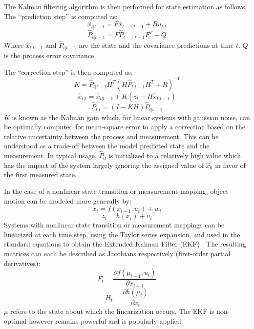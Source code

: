 \documentclass[a4paper,twoside,12pt]{report}
\begin{document}
The Kalman filtering algorithm is then performed for state estimation as follows. The ``prediction step'' is computed as:
\begin{equation}
\hat{x}_{t|t-1}=F\hat{x}_{t-1|t-1}+Bu_{t|t}
\end{equation}
\begin{equation}
\hat{P}_{t|t-1}=F\hat{P}_{t-1|t-1}F^T+Q 
\end{equation}
Where $\hat{x}_{t|t-1}$ and $\hat{P}_{t|t-1}$ are the state and the covariance predictions at  time $t$. $Q$ is the process error covariance.

The ``correction step'' is then computed as:
\begin{equation} 
K = \hat{P}_{t|t-1}H^T(H\hat{P}_{t|t-1}H^T+R)^{-1}
\end{equation}
\begin{equation} 
\hat{x}_{t|t} = \hat{x}_{t|t-1}+K(z_t-H\hat{x}_{t|t-1})
\end{equation}
\begin{equation} 
\hat{P}_{t|t}=(I-KH)\hat{P}_{t|t-1}
\end{equation}
$K$ is known as the Kalman gain which, for linear systems with gaussian noise, can be optimally computed for mean-square error to apply a correction based on the relative uncertainty between the process and measurement. This can be understood as a trade-off between the model predicted state and the measurement. In typical usage, $\hat{P}_0$ is initialized to a relatively high value which has the impact of the system largely ignoring the assigned value of $\hat{x}_{0}$ in favor of the first measured state.

In the case of a nonlinear state transition or measurement mapping, object motion can be modeled more generally by:
\begin{equation} 
x_t=f(x_{t-1},u_{t})+w_{t}
\end{equation}
\begin{equation} 
z_t=h(x_{t})+{\upsilon}_t
\end{equation}
Systems with nonlinear state transition or measurement mappings can be linearized at each time step, using the Taylor series expansion, and used in the standard equations to obtain the Extended Kalman Filter (EKF) \citep{trackbook}. The resulting matrices can each be described as Jacobians respectively (first-order partial derivatives):
\begin{equation}
F_t = \frac{\partial f(\mu_{t-1}, u_{t})}{\partial x_{t-1}}
\end{equation}
\begin{equation} 
H_t = \frac{\partial h(\mu_{t})}{\partial x_t} 
\end{equation}
 $\mu$ refers to the state about which the linearization occurs. The EKF is non-optimal however remains powerful and is popularly applied.
\end{document}
